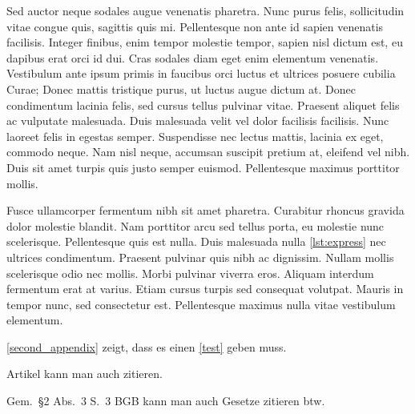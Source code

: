 \documentclass[%
    auto-generate   = true,             %
    debug           = true,             %
    print-ndn       = true,             %
    print-loa       = true,             %
    print-lof       = true,             %
    print-lot       = true,             %
    print-lol       = true,             %
    bib-file        = literature.bib,   %
    plantuml        = true,             %
    title-style     = default,          %
    font-size       = 12pt              %
]{udhbwvst}
\begin{document}
Sed auctor neque sodales augue venenatis pharetra. Nunc purus felis, sollicitudin vitae congue quis, sagittis quis mi. Pellentesque non ante id sapien venenatis facilisis. Integer finibus, enim tempor molestie tempor, sapien nisl dictum est, eu dapibus erat orci id dui. Cras sodales diam eget enim elementum venenatis. Vestibulum ante ipsum primis in faucibus orci luctus et ultrices posuere cubilia Curae; Donec mattis tristique purus, ut luctus augue dictum at. Donec condimentum lacinia felis, sed cursus tellus pulvinar vitae. Praesent aliquet felis ac vulputate malesuada. Duis malesuada velit vel dolor facilisis facilisis. Nunc laoreet felis in egestas semper. Suspendisse nec lectus mattis, lacinia ex eget, commodo neque. Nam nisl neque, accumsan suscipit pretium at, eleifend vel nibh. Duis sit amet turpis quis justo semper euismod. Pellentesque maximus porttitor mollis.


Fusce ullamcorper fermentum nibh sit amet pharetra. Curabitur rhoncus gravida dolor molestie blandit. Nam porttitor arcu sed tellus porta, eu molestie nunc scelerisque. Pellentesque quis est nulla. Duis malesuada nulla \autoref{lst:express} nec ultrices condimentum. Praesent pulvinar quis nibh ac dignissim. Nullam mollis scelerisque odio nec mollis. Morbi pulvinar viverra eros. Aliquam interdum fermentum erat at varius. Etiam cursus turpis sed consequat volutpat. Mauris in tempor nunc, sed consectetur est. Pellentesque maximus nulla vitae vestibulum elementum. 

\blinddocument

\autoref{second_appendix} zeigt, dass es einen \autoref{test} geben muss.

Artikel kann man auch zitieren.

Gem.\ §2 Abs.\ 3 S.\ 3 BGB kann man auch Gesetze zitieren btw.\nocite{bgb}

\begin{dhbwappendices}

    \lipsum

    \lipsum

\end{dhbwappendices}
\end{document}

